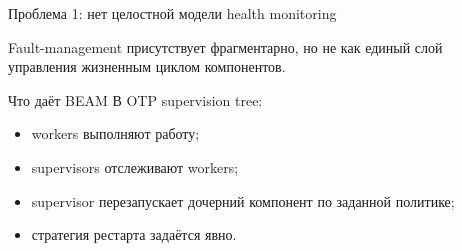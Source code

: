 	\begin{frame}{Проблема 1: нет целостной модели health monitoring}
	
	Fault-management присутствует фрагментарно, но не как единый слой управления жизненным циклом компонентов.
	
	\begin{block}{Что даёт BEAM}
		В OTP supervision tree:
		\begin{itemize}
			\item workers выполняют работу;
			\item supervisors отслеживают workers;
			\item supervisor перезапускает дочерний компонент по заданной политике;
			\item стратегия рестарта задаётся явно.
		\end{itemize}
	\end{block}
\end{frame}